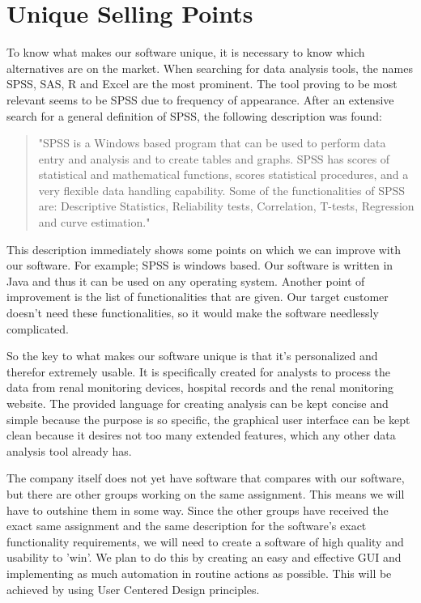 \documentclass[a4paper]{article}
\begin{document}
\section{Unique Selling Points}
To know what makes our software unique, it is necessary to know which alternatives are on the market. When searching for data analysis tools, the names SPSS, SAS, R and Excel are the most prominent. The tool proving to be most relevant seems to be SPSS due to frequency of appearance. After an extensive search for a general definition of SPSS, the following description was found: 
\begin{quotation}
"SPSS is a Windows based program that can be used to perform data entry and analysis
and to create tables and graphs. SPSS has scores of statistical and mathematical functions,
scores statistical procedures, and a very flexible data handling capability. Some of the
functionalities of SPSS are: Descriptive Statistics, Reliability tests, Correlation, T-tests,
Regression and curve estimation." \cite{spssdescription}
\end{quotation}
\par 
This description immediately shows some points on which we can improve with our software. For example; SPSS is windows based. Our software is written in Java and thus it can be used on any operating system. Another point of improvement is the list of functionalities that are given. Our target customer doesn't need these functionalities, so it would make the software needlessly complicated.
\par
So the key to what makes our software unique is that it's personalized and therefor extremely usable. It is specifically created for analysts to process the data from renal monitoring devices, hospital records and the renal monitoring website. The provided language for creating analysis can be kept concise and simple because the purpose is so specific, the graphical user interface can be kept clean because it desires not too many extended features, which any other data analysis tool already has. 
\par 
The company itself does not yet have software that compares with our software, but there are other groups working on the same assignment. This means we will have to outshine them in some way. Since the other groups have received the exact same assignment and the same description for the software's exact functionality requirements, we will need to create a software of high quality and usability to 'win'. We plan to do this by creating an easy and effective GUI and implementing as much automation in routine actions as possible. This will be achieved by using User Centered Design principles\cite{nielsen}.
\end{document}

